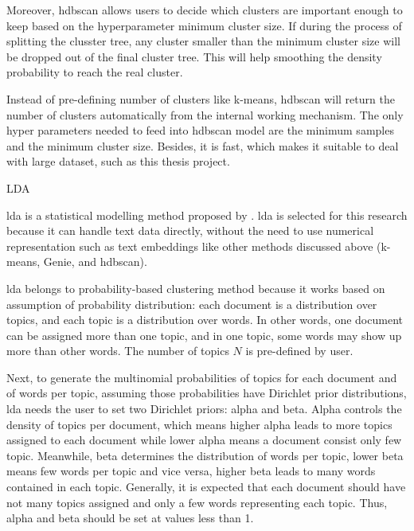 \documentclass[a4paper,man,floatsintext,natbib,noextraspace]{apa6}
\makeatletter
\renewcommand{\subsubsection}{\@startsection{subsubsection}{3}
  {\z@}
  {\b@level@two@skip}
  {\e@level@two@skip}
  {\normalfont\normalsize\bfseries\itshape}}
\makeatother
\begin{document}
Moreover, \gls{hdbscan} allows users to decide which clusters are important enough to keep based on the hyperparameter minimum cluster size. If during the process of splitting the clusster tree, any cluster smaller than the minimum cluster size will be dropped out of the final cluster tree. This will help smoothing the density probability to reach the real cluster.

Instead of pre-defining number of clusters like k-means, \gls{hdbscan} will return the number of clusters automatically from the internal working mechanism. The only hyper parameters needed to feed into \gls{hdbscan} model are the minimum samples and the minimum cluster size. Besides, it is fast, which makes it suitable to deal with large dataset, such as this thesis project.

\subsubsection{LDA}

\gls{lda} is a statistical modelling method proposed by \cite{bleiLatentDirichletAllocation2003}. 
\gls{lda} is selected for this research because it can handle text data directly, without the need to use numerical representation such as text embeddings like other methods discussed above (k-means, Genie, and \gls{hdbscan}). 

\gls{lda} belongs to probability-based clustering method because it works based on assumption of probability distribution: each document is a distribution over topics, and
each topic is a distribution over words. In other words, one document can be assigned more than one topic, and in one topic, some words may show up more than other words. The number of topics $N$ is pre-defined by user.

Next, to generate the multinomial probabilities of topics for each document and of words per topic, assuming those probabilities have Dirichlet prior distributions, \gls{lda} needs the user to set two Dirichlet priors: alpha and beta. Alpha controls the density of topics per document, which means higher alpha leads to more topics assigned to each document while lower alpha means a document consist only few topic. Meanwhile, beta determines the distribution of words per topic, lower beta means few words per topic and vice versa, higher beta leads to many words contained in each topic. Generally, it is expected that each document should have not many topics assigned and only a few words representing each topic. Thus, alpha and beta should be set at values less than 1. 
\end{document}
